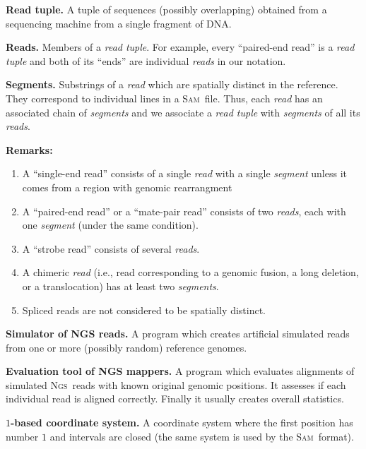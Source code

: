 \documentclass[10pt,a4paper]{article}
\newcommand{\SAM}{\textsc{Sam}}
\newcommand{\NGS}{\textsc{Ngs}}
\begin{document}
\begin{description}
	\item \textbf{Read tuple.} 
	A tuple of sequences (possibly overlapping) obtained from a sequencing machine from a single fragment of DNA.

	\item \textbf{Reads.} 
	Members of a {\em read tuple}. For example, every ``paired-end read'' is a {\em read tuple} and both of its ``ends'' are individual {\em reads} in our notation.

	\item \textbf{Segments.}
	Substrings of a {\em read} which are spatially distinct in the reference.
	They correspond to individual lines in a \SAM\ file. Thus, each {\em read} has an
	associated chain of {\em segments} and we associate
	a {\em read tuple} with {\em segments} of all its {\em reads}.
		
	\textbf{Remarks:}
	\begin{enumerate}[-]
		\item A ``single-end read'' consists of a single {\em read} with a single {\em segment}
		unless it comes from a region with genomic rearrangment
		\item A ``paired-end read'' or a ``mate-pair read'' consists
		of two {\em reads}, each with one {\em segment} (under the same condition).
		\item A ``strobe read'' consists of several {\em reads}.
		\item A chimeric {\em read} (i.e., read corresponding to a genomic fusion, a long deletion, or a translocation) has at least two {\em segments}.
		\item Spliced reads are not considered to be spatially distinct.
	\end{enumerate}

	

	\item \textbf{Simulator of NGS reads.}
	A program which creates artificial simulated reads from one
	or more (possibly random) reference genomes.
	
		
	\item \textbf{Evaluation tool of NGS mappers.} 
	A program which evaluates alignments of simulated \NGS\ reads with known original
	genomic positions. It assesses if each individual read is aligned correctly. 	Finally it usually creates overall statistics.

	\item \textbf{$1$-based coordinate system.}
	A coordinate system where the first position has number $1$
	and intervals are closed (the same system is used by the \SAM\ format).
\end{description}
\end{document}
